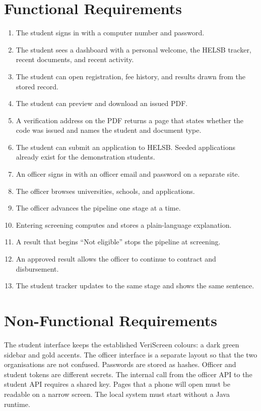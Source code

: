 \documentclass[12pt,a4paper]{report}
\begin{document}
\section{Functional Requirements}
\begin{enumerate}
    \item The student signs in with a computer number and password.
    \item The student sees a dashboard with a personal welcome, the HELSB tracker, recent documents, and recent activity.
    \item The student can open registration, fee history, and results drawn from the stored record.
    \item The student can preview and download an issued PDF.
    \item A verification address on the PDF returns a page that states whether the code was issued and names the student and document type.
    \item The student can submit an application to HELSB. Seeded applications already exist for the demonstration students.
    \item An officer signs in with an officer email and password on a separate site.
    \item The officer browses universities, schools, and applications.
    \item The officer advances the pipeline one stage at a time.
    \item Entering screening computes and stores a plain-language explanation.
    \item A result that begins ``Not eligible'' stops the pipeline at screening.
    \item An approved result allows the officer to continue to contract and disbursement.
    \item The student tracker updates to the same stage and shows the same sentence.
\end{enumerate}

\section{Non-Functional Requirements}
The student interface keeps the established VeriScreen colours: a dark green sidebar and gold accents. The officer interface is a separate layout so that the two organisations are not confused. Passwords are stored as hashes. Officer and student tokens are different secrets. The internal call from the officer API to the student API requires a shared key. Pages that a phone will open must be readable on a narrow screen. The local system must start without a Java runtime.
\end{document}
